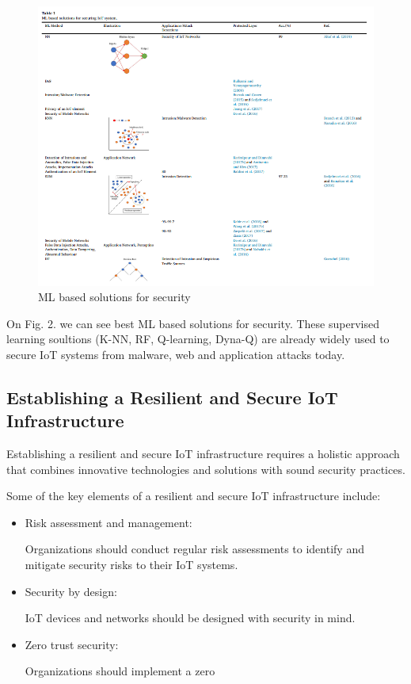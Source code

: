 \documentclass[conference]{IEEEtran}
\begin{document}
\begin{figure}
    \includegraphics[width=0.9\linewidth]{image1.png}
    \caption{ML based solutions for security}
\end{figure}
On Fig. 2.\cite{b16} we can see best ML based solutions for security. These supervised learning soultions (K-NN, RF, Q-learning, Dyna-Q) are already widely used to secure IoT systems from malware, web and application attacks today.

\subsection{Establishing a Resilient and Secure IoT Infrastructure} 

Establishing a resilient and secure IoT infrastructure requires a holistic approach that combines innovative technologies and solutions with sound security practices.

Some of the key elements of a resilient and secure IoT infrastructure include:

\begin{itemize}
    \item Risk assessment and management:
    
    Organizations should conduct regular risk assessments to identify and mitigate security risks to their IoT systems.
    \item Security by design:
    
    IoT devices and networks should be designed with security in mind.
    \item Zero trust security: 
    
    Organizations should implement a zero
\end{itemize}
\end{document}
